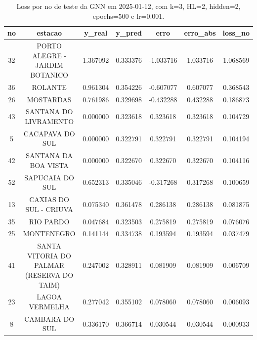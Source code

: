 \begin{table}[h]
\centering
\caption{Loss por no de teste da GNN em 2025-01-12, com k=3, HL=2, hidden=2, epochs=500 e lr=0.001.}
\label{tab:gnn_loss_k3_hl2_h2_e500_d20250112}
\begin{tabular}{ccccccc}
\toprule
no & estacao & y\_real & y\_pred & erro & erro\_abs & loss\_no \\
\midrule
32 & PORTO ALEGRE - JARDIM BOTANICO & 1.367092 & 0.333376 & -1.033716 & 1.033716 & 1.068569 \\
36 & ROLANTE & 0.961304 & 0.354226 & -0.607077 & 0.607077 & 0.368543 \\
26 & MOSTARDAS & 0.761986 & 0.329698 & -0.432288 & 0.432288 & 0.186873 \\
43 & SANTANA DO LIVRAMENTO & 0.000000 & 0.323618 & 0.323618 & 0.323618 & 0.104729 \\
5 & CACAPAVA DO SUL & 0.000000 & 0.322791 & 0.322791 & 0.322791 & 0.104194 \\
42 & SANTANA DA BOA VISTA & 0.000000 & 0.322670 & 0.322670 & 0.322670 & 0.104116 \\
52 & SAPUCAIA DO SUL & 0.652313 & 0.335046 & -0.317268 & 0.317268 & 0.100659 \\
13 & CAXIAS DO SUL - CRIUVA & 0.075340 & 0.361478 & 0.286138 & 0.286138 & 0.081875 \\
35 & RIO PARDO & 0.047684 & 0.323503 & 0.275819 & 0.275819 & 0.076076 \\
25 & MONTENEGRO & 0.141144 & 0.334738 & 0.193594 & 0.193594 & 0.037479 \\
41 & SANTA VITORIA DO PALMAR (RESERVA DO TAIM) & 0.247002 & 0.328911 & 0.081909 & 0.081909 & 0.006709 \\
23 & LAGOA VERMELHA & 0.277042 & 0.355102 & 0.078060 & 0.078060 & 0.006093 \\
8 & CAMBARA DO SUL & 0.336170 & 0.366714 & 0.030544 & 0.030544 & 0.000933 \\
\bottomrule
\end{tabular}
\end{table}
